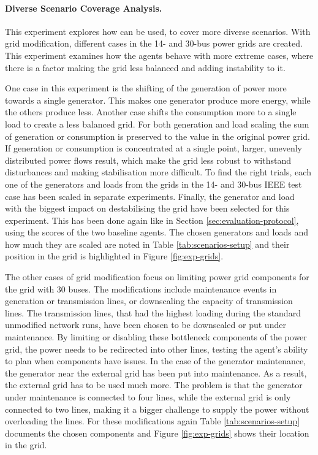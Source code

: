 \paragraph{Diverse Scenario Coverage Analysis.}
This experiment explores how \benchmark can be used, to cover more diverse scenarios. With grid modification, different cases in the 14- and 30-bus power grids are created. This experiment examines how the agents behave with more extreme cases, where there is a factor making the grid less balanced and adding instability to it. 

One case in this experiment is the shifting of the generation of power more towards a single generator. This makes one generator produce more energy, while the others produce less. Another case shifts the consumption more to a single load to create a less balanced grid. For both generation and load scaling the sum of generation or consumption is preserved to the value in the original power grid. If generation or consumption is concentrated at a single point, larger, unevenly distributed power flows result, which make the grid less robust to withstand disturbances and making stabilisation more difficult.
To find the right trials, each one of the generators and loads from the grids in the 14- and 30-bus IEEE test case has been scaled in separate experiments. Finally, the generator and load with the biggest impact on destabilising the grid have been selected for this experiment. This has been done again like in Section \ref{sec:evaluation-protocol}, using the scores of the two baseline agents. The chosen generators and loads and how much they are scaled are noted in Table \ref{tab:scenarios-setup} and their position in the grid is highlighted in Figure \ref{fig:exp-grids}.

The other cases of grid modification focus on limiting power grid components for the grid with 30 buses. The modifications include maintenance events in generation or transmission lines, or downscaling the capacity of transmission lines.
The transmission lines, that had the highest loading during the standard unmodified network runs, have been chosen to be downscaled or put under maintenance. By limiting or disabling these bottleneck components of the power grid, the power needs to be redirected into other lines, testing the agent's ability to plan when components have issues. In the case of the generator maintenance, the generator near the external grid has been put into maintenance. As a result, the external grid has to be used much more. The problem is that the generator under maintenance is connected to four lines, while the external grid is only connected to two lines, making it a bigger challenge to supply the power without overloading the lines. For these modifications again Table \ref{tab:scenarios-setup} documents the chosen components and Figure \ref{fig:exp-grids} shows their location in the grid.

